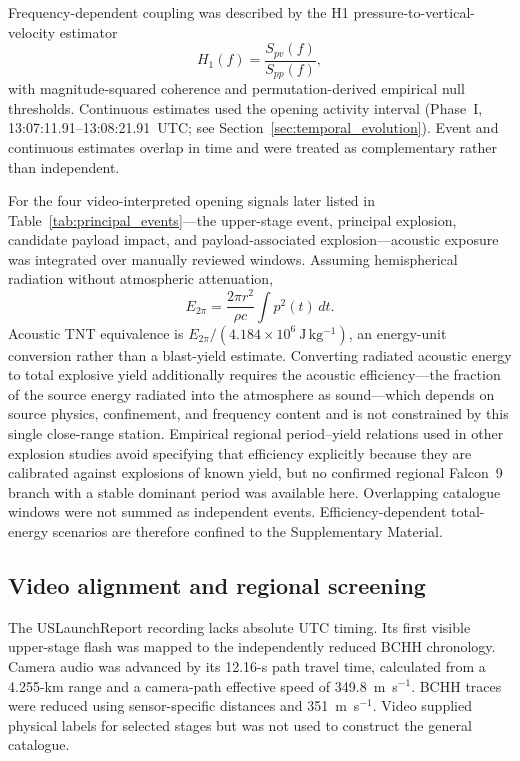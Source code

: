 \documentclass[]{seismica}
\begin{document}
Frequency-dependent coupling was described by the H1 pressure-to-vertical-velocity estimator
\begin{equation}
 H_1(f)=\frac{S_{pv}(f)}{S_{pp}(f)},
 \label{eq:h1_transfer}
\end{equation}
with magnitude-squared coherence and permutation-derived empirical null
thresholds. Continuous estimates used the opening activity interval
(Phase~I, 13:07:11.91--13:08:21.91~UTC; see Section~\ref{sec:temporal_evolution}).
Event and continuous estimates overlap in time and were treated as
complementary rather than independent.

For the four video-interpreted opening signals later listed in
Table~\ref{tab:principal_events}---the upper-stage event, principal explosion,
candidate payload impact, and payload-associated explosion---acoustic exposure
was integrated over manually reviewed windows. Assuming hemispherical
radiation without atmospheric attenuation,
\begin{equation}
 E_{2\pi}=\frac{2\pi r^2}{\rho c}\int p^2(t)\,dt.
 \label{eq:acoustic_energy}
\end{equation}
Acoustic TNT equivalence is $E_{2\pi}/(4.184\times10^6~\mathrm{J\,kg^{-1}})$,
an energy-unit conversion rather than a blast-yield estimate. Converting
radiated acoustic energy to total explosive yield additionally requires the
acoustic efficiency---the fraction of the source energy radiated into the
atmosphere as sound---which depends on source physics, confinement, and
frequency content and is not constrained by this single close-range station.
Empirical regional period--yield relations used in other explosion studies
avoid specifying that efficiency explicitly because they are calibrated
against explosions of known yield, but no confirmed regional Falcon~9 branch
with a stable dominant period was available here. Overlapping catalogue
windows were not summed as independent events. Efficiency-dependent
total-energy scenarios are therefore confined to the Supplementary Material.

\subsection{Video alignment and regional screening}

The USLaunchReport recording lacks absolute UTC timing. Its first visible upper-stage
flash was mapped to the independently reduced BCHH chronology. Camera audio
was advanced by its 12.16-s path travel time, calculated from a 4.255-km range
and a camera-path effective speed of 349.8~m~s$^{-1}$. BCHH traces were reduced
using sensor-specific distances and 351~m~s$^{-1}$. Video supplied physical
labels for selected stages but was not used to construct the general catalogue.
\end{document}
